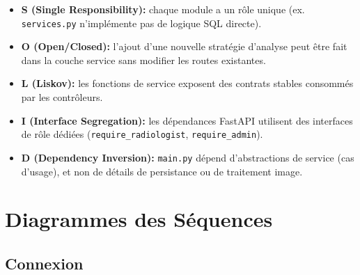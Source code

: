\documentclass[12pt, a4paper]{report}
\begin{document}
\begin{infobox}
\begin{itemize}
  \item \textbf{S (Single Responsibility):} chaque module a un rôle unique (ex. \texttt{services.py} n'implémente pas de logique SQL directe).
  \item \textbf{O (Open/Closed):} l'ajout d'une nouvelle stratégie d'analyse peut être fait dans la couche service sans modifier les routes existantes.
  \item \textbf{L (Liskov):} les fonctions de service exposent des contrats stables consommés par les contrôleurs.
  \item \textbf{I (Interface Segregation):} les dépendances FastAPI utilisent des interfaces de rôle dédiées (\texttt{require\_radiologist}, \texttt{require\_admin}).
  \item \textbf{D (Dependency Inversion):} \texttt{main.py} dépend d'abstractions de service (cas d'usage), et non de détails de persistance ou de traitement image.
\end{itemize}
\end{infobox}

\section{Diagrammes des Séquences}

\subsection{Connexion}
\end{document}
